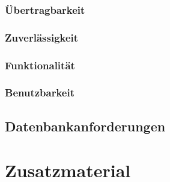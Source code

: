 
\subsection{Übertragbarkeit}
\label{srs:uebertragbarkeit}


\subsection{Zuverlässigkeit}
\label{srs:zuverlaessigkeit}


\subsection{Funktionalität}
\label{srs:funktionalität}


\subsection{Benutzbarkeit}
\label{srs:benutzbarkeit}


\section{Datenbankanforderungen}
\label{srs:datenbankanforderungen}



\chapter{Zusatzmaterial}
\label{srs:zusatzmaterial}

